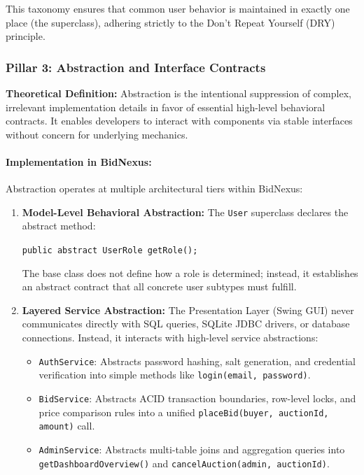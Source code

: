 This taxonomy ensures that common user behavior is maintained in exactly one place (the superclass), adhering strictly to the Don't Repeat Yourself (DRY) principle.

\subsubsection{Pillar 3: Abstraction and Interface Contracts}
\textbf{Theoretical Definition:} Abstraction is the intentional suppression of complex, irrelevant implementation details in favor of essential high-level behavioral contracts. It enables developers to interact with components via stable interfaces without concern for underlying mechanics.

\paragraph{Implementation in BidNexus:}
Abstraction operates at multiple architectural tiers within BidNexus:
\begin{enumerate}
    \item \textbf{Model-Level Behavioral Abstraction:} The \texttt{User} superclass declares the abstract method:
    \begin{center}
    \texttt{public abstract UserRole getRole();}
    \end{center}
    The base class does not define how a role is determined; instead, it establishes an abstract contract that all concrete user subtypes must fulfill.
    \item \textbf{Layered Service Abstraction:} The Presentation Layer (Swing GUI) never communicates directly with SQL queries, SQLite JDBC drivers, or database connections. Instead, it interacts with high-level service abstractions:
    \begin{itemize}
        \item \texttt{AuthService}: Abstracts password hashing, salt generation, and credential verification into simple methods like \texttt{login(email, password)}.
        \item \texttt{BidService}: Abstracts ACID transaction boundaries, row-level locks, and price comparison rules into a unified \texttt{placeBid(buyer, auctionId, amount)} call.
        \item \texttt{AdminService}: Abstracts multi-table joins and aggregation queries into \texttt{getDashboardOverview()} and \texttt{cancelAuction(admin, auctionId)}.
    \end{itemize}
\end{enumerate}

